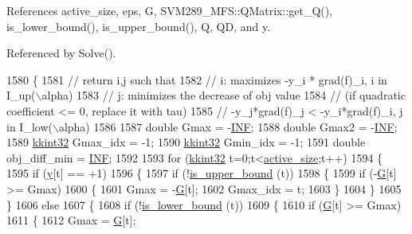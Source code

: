 References active\+\_\+size, eps, G, S\+V\+M289\+\_\+\+M\+F\+S\+::\+Q\+Matrix\+::get\+\_\+\+Q(), is\+\_\+lower\+\_\+bound(), is\+\_\+upper\+\_\+bound(), Q, QD, and y.



Referenced by Solve().


\begin{DoxyCode}
1580 \{
1581   \textcolor{comment}{// return i,j such that}
1582   \textcolor{comment}{// i: maximizes -y\_i * grad(f)\_i, i in I\_up(\(\backslash\)alpha)}
1583   \textcolor{comment}{// j: minimizes the decrease of obj value}
1584   \textcolor{comment}{//    (if quadratic coefficient <= 0, replace it with tau)}
1585   \textcolor{comment}{//    -y\_j*grad(f)\_j < -y\_i*grad(f)\_i, j in I\_low(\(\backslash\)alpha)}
1586   
1587   \textcolor{keywordtype}{double}  Gmax         = -\hyperlink{svm2_8cpp_a12c2040f25d8e3a7b9e1c2024c618cb6}{INF};
1588   \textcolor{keywordtype}{double}  Gmax2        = -\hyperlink{svm2_8cpp_a12c2040f25d8e3a7b9e1c2024c618cb6}{INF};
1589   \hyperlink{namespace_k_k_b_a8fa4952cc84fda1de4bec1fbdd8d5b1b}{kkint32}   Gmax\_idx     = -1;
1590   \hyperlink{namespace_k_k_b_a8fa4952cc84fda1de4bec1fbdd8d5b1b}{kkint32}   Gmin\_idx     = -1;
1591   \textcolor{keywordtype}{double}  obj\_diff\_min = \hyperlink{svm2_8cpp_a12c2040f25d8e3a7b9e1c2024c618cb6}{INF};
1592 
1593   \textcolor{keywordflow}{for}  (\hyperlink{namespace_k_k_b_a8fa4952cc84fda1de4bec1fbdd8d5b1b}{kkint32} t=0;t<\hyperlink{class_s_v_m289___m_f_s_1_1_solver_a8996bbbda51e87b157af0e8c4ad78411}{active\_size};t++)
1594   \{
1595     \textcolor{keywordflow}{if}  (\hyperlink{class_s_v_m289___m_f_s_1_1_solver_ab9586d6d550d7806b9582b9279217ff5}{y}[t] == +1)
1596     \{
1597       \textcolor{keywordflow}{if}  (!\hyperlink{class_s_v_m289___m_f_s_1_1_solver_a9648a7dd5e4e6818cdf255ffb1340187}{is\_upper\_bound} (t))
1598       \{
1599         \textcolor{keywordflow}{if}  (-\hyperlink{class_s_v_m289___m_f_s_1_1_solver_a96465496d62f5c9566275270d7a54a4f}{G}[t] >= Gmax)
1600         \{
1601           Gmax     = -\hyperlink{class_s_v_m289___m_f_s_1_1_solver_a96465496d62f5c9566275270d7a54a4f}{G}[t];
1602           Gmax\_idx = t;
1603         \}
1604       \}
1605     \}
1606     \textcolor{keywordflow}{else}
1607     \{
1608       \textcolor{keywordflow}{if}  (!\hyperlink{class_s_v_m289___m_f_s_1_1_solver_a2fe8c6cd332cef1fe1622fb6faa98e19}{is\_lower\_bound} (t))
1609       \{
1610         \textcolor{keywordflow}{if}  (\hyperlink{class_s_v_m289___m_f_s_1_1_solver_a96465496d62f5c9566275270d7a54a4f}{G}[t] >= Gmax)
1611         \{
1612           Gmax = \hyperlink{class_s_v_m289___m_f_s_1_1_solver_a96465496d62f5c9566275270d7a54a4f}{G}[t];

\end{DoxyCode}
